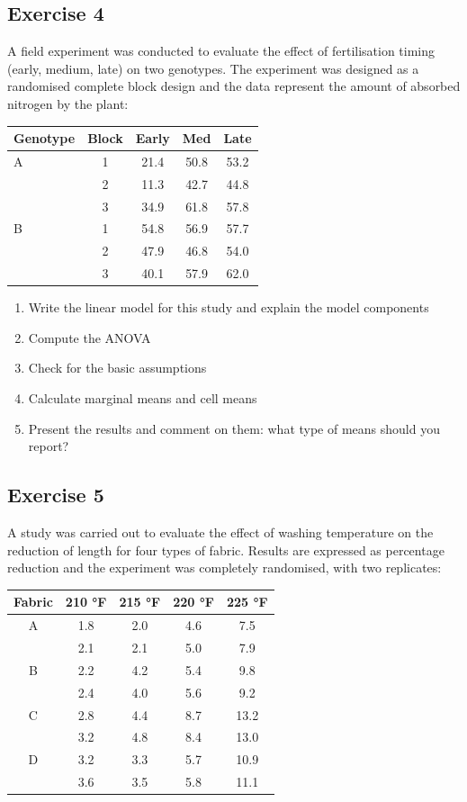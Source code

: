 \documentclass[a4paper,12pt,oneside]{book}
\providecommand{\tightlist}{%
  \setlength{\itemsep}{0pt}\setlength{\parskip}{0pt}}
\begin{document}
\hypertarget{exercise-4-3}{%
\subsection{Exercise 4}\label{exercise-4-3}}

A field experiment was conducted to evaluate the effect of fertilisation timing (early, medium, late) on two genotypes. The experiment was designed as a randomised complete block design and the data represent the amount of absorbed nitrogen by the plant:

\begin{longtable}[]{@{}lcccc@{}}
\toprule
Genotype & Block & Early & Med & Late \\
\midrule
\endhead
A & 1 & 21.4 & 50.8 & 53.2 \\
& 2 & 11.3 & 42.7 & 44.8 \\
& 3 & 34.9 & 61.8 & 57.8 \\
B & 1 & 54.8 & 56.9 & 57.7 \\
& 2 & 47.9 & 46.8 & 54.0 \\
& 3 & 40.1 & 57.9 & 62.0 \\
\bottomrule
\end{longtable}

\begin{enumerate}
\def\labelenumi{\arabic{enumi}.}
\tightlist
\item
  Write the linear model for this study and explain the model components
\item
  Compute the ANOVA
\item
  Check for the basic assumptions
\item
  Calculate marginal means and cell means
\item
  Present the results and comment on them: what type of means should you report?
\end{enumerate}

\hypertarget{exercise-5-2}{%
\subsection{Exercise 5}\label{exercise-5-2}}

A study was carried out to evaluate the effect of washing temperature on the reduction of length for four types of fabric. Results are expressed as percentage reduction and the experiment was completely randomised, with two replicates:

\begin{longtable}[]{@{}ccccc@{}}
\toprule
Fabric & 210 °F & 215 °F & 220 °F & 225 °F \\
\midrule
\endhead
A & 1.8 & 2.0 & 4.6 & 7.5 \\
& 2.1 & 2.1 & 5.0 & 7.9 \\
B & 2.2 & 4.2 & 5.4 & 9.8 \\
& 2.4 & 4.0 & 5.6 & 9.2 \\
C & 2.8 & 4.4 & 8.7 & 13.2 \\
& 3.2 & 4.8 & 8.4 & 13.0 \\
D & 3.2 & 3.3 & 5.7 & 10.9 \\
& 3.6 & 3.5 & 5.8 & 11.1 \\
\bottomrule
\end{longtable}
\end{document}
